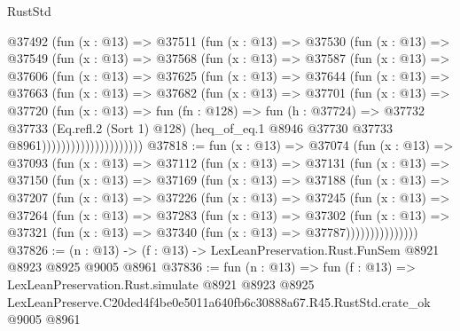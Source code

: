 \begin{lexlean}{RustStd}
\begin{coremodule}
                @37492
                  (fun (x : @13) =>
                  @37511
                    (fun (x : @13) =>
                    @37530
                      (fun (x : @13) =>
                      @37549
                        (fun (x : @13) =>
                        @37568
                          (fun (x : @13) =>
                          @37587
                            (fun (x : @13) =>
                            @37606
                              (fun (x : @13) =>
                              @37625
                                (fun (x : @13) =>
                                @37644
                                  (fun (x : @13) =>
                                  @37663
                                    (fun (x : @13) =>
                                    @37682
                                      (fun (x : @13) =>
                                      @37701
                                        (fun (x : @13) =>
                                        @37720
                                          (fun (x : @13) =>
                                          fun (fn : @128) =>
                                          fun (h : @37724) =>
                                          @37732
                                            @37733
                                            (Eq.refl.{2} (Sort 1) @128)
                                            (heq_of_eq.{1}
                                              @8946
                                              @37730
                                              @37733
                                              @8961)))))))))))))))))))))
@37818 := fun (x : @13) =>
  @37074
    (fun (x : @13) =>
    @37093
      (fun (x : @13) =>
      @37112
        (fun (x : @13) =>
        @37131
          (fun (x : @13) =>
          @37150
            (fun (x : @13) =>
            @37169
              (fun (x : @13) =>
              @37188
                (fun (x : @13) =>
                @37207
                  (fun (x : @13) =>
                  @37226
                    (fun (x : @13) =>
                    @37245
                      (fun (x : @13) =>
                      @37264
                        (fun (x : @13) =>
                        @37283
                          (fun (x : @13) =>
                          @37302
                            (fun (x : @13) =>
                            @37321 (fun (x : @13) => @37340 (fun (x : @13) => @37787)))))))))))))))
@37826 := (n : @13) -> (f : @13) -> LexLeanPreservation.Rust.FunSem @8921 @8923 @8925 @9005 @8961
@37836 := fun (n : @13) =>
  fun (f : @13) =>
  LexLeanPreservation.Rust.simulate
    @8921
    @8923
    @8925
    LexLeanPreserve.C20ded4f4be0e5011a640fb6c30888a67.R45.RustStd.crate_ok
    @9005
    @8961
\end{coremodule}
\end{lexlean}

